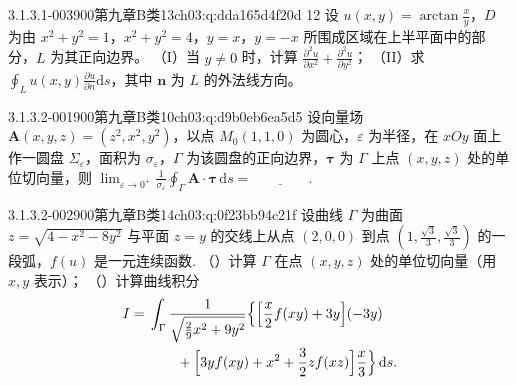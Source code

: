 \begin{q}{3.1.3.1-003}{900第九章B类13}{ch03:q:dda165d4f20d}
12 设 $u(x,y)=\arctan\frac{x}{y}$，$D$ 为由 $x^2+y^2=1$，$x^2+y^2=4$，$y=x$，$y=-x$ 所围成区域在上半平面中的部分，$L$ 为其正向边界。
（I）当 $y\neq 0$ 时，计算 $\frac{\partial^2 u}{\partial x^2}+\frac{\partial^2 u}{\partial y^2}$；
（II）求 $\displaystyle \oint_L u(x,y)\frac{\partial u}{\partial n}\mathrm{d}s$，其中 $\boldsymbol{n}$ 为 $L$ 的外法线方向。
\end{q}

\par\addvspace{2.4ex}\noindent
\begin{minipage}{\linewidth}

\begin{q}{3.1.3.2-001}{900第九章B类10}{ch03:q:d9b0eb6ea5d5}
设向量场 $\boldsymbol{A}(x,y,z)=(z^2,x^2,y^2)$，以点 $M_0(1,1,0)$ 为圆心，$\varepsilon$ 为半径，在 $xOy$ 面上作一圆盘 $\Sigma_\varepsilon$，面积为 $\sigma_\varepsilon$，$\Gamma$ 为该圆盘的正向边界，$\boldsymbol{\tau}$ 为 $\Gamma$ 上点 $(x,y,z)$ 处的单位切向量，则
$\displaystyle \lim_{\varepsilon\to 0^+}\frac{1}{\sigma_\varepsilon}\oint_\Gamma \boldsymbol{A}\cdot \boldsymbol{\tau}\,\mathrm{d}s=\underline{\hspace{4em}}.$
\end{q}
\end{minipage}


\begin{q}{3.1.3.2-002}{900第九章B类14}{ch03:q:0f23bb94c21f}
设曲线 $\Gamma$ 为曲面 $z=\sqrt{4-x^2-8y^2}$ 与平面 $z=y$ 的交线上从点 $(2,0,0)$ 到点 $\left(1,\frac{\sqrt{3}}{3},\frac{\sqrt{3}}{3}\right)$ 的一段弧，$f(u)$ 是一元连续函数.
（）计算 $\Gamma$ 在点 $(x,y,z)$ 处的单位切向量（用 $x,y$ 表示）；
（）计算曲线积分
\[
\begin{aligned}
I={}&\int_\Gamma \frac{1}{\sqrt{\frac{2}{9}x^2+9y^2}}
\Bigl\{\Bigl[\frac{x}{2}f(xy)+3y\Bigr](-3y)\\
&\qquad+\Bigl[3yf(xy)+x^2+\frac{3}{2}zf(xz)\Bigr]\frac{x}{3}\Bigr\}\,\mathrm{d}s.
\end{aligned}
\]
\end{q}

